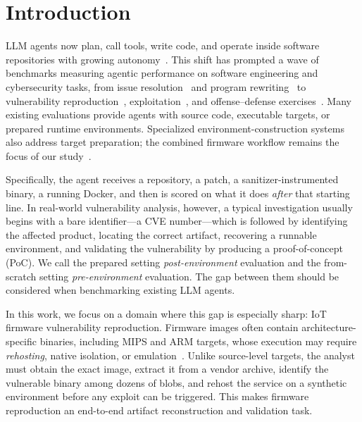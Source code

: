 \section{Introduction}

%
LLM agents now plan, call tools, write code, and operate inside software repositories with growing autonomy~\cite{swebench,programbench}.
%
This shift has prompted a wave of benchmarks measuring agentic performance on software engineering and cybersecurity tasks, from issue resolution~\cite{swebench} and program rewriting~\cite{programbench} to vulnerability reproduction~\cite{cybergym,krepro}, exploitation~\cite{cvebench,exploitgym,exploitbench}, and offense--defense exercises~\cite{bountybench,secbench}.
%
Many existing evaluations provide agents with source code, executable targets, or prepared runtime environments. Specialized environment-construction systems also address target preparation; the combined firmware workflow remains the focus of our study~\cite{cvegenie}.

%
Specifically, the agent receives a repository, a patch, a sanitizer-instrumented binary, a running Docker, and then is scored on what it does \emph{after} that starting line.
%
In real-world vulnerability analysis, however, a typical investigation usually begins with a bare identifier---a CVE number---which is followed by identifying the affected product, locating the correct artifact, recovering a runnable environment, and validating the vulnerability by producing a proof-of-concept (PoC).
%
We call the prepared setting \emph{post-environment} evaluation and the from-scratch setting \emph{pre-environment} evaluation.
%
The gap between them should be considered when benchmarking existing LLM agents.

In this work, we focus on a domain where this gap is especially sharp: IoT firmware vulnerability reproduction.
%
Firmware images often contain architecture-specific binaries, including MIPS and ARM targets, whose execution may require \textit{rehosting}, native isolation, or emulation~\cite{challenges,firmadyne,firmae}.
%
Unlike source-level targets, the analyst must obtain the exact image, extract it from a vendor archive, identify the vulnerable binary among dozens of blobs, and rehost the service on a synthetic environment before any exploit can be triggered.
%
This makes firmware reproduction an end-to-end artifact reconstruction and validation task.
%

